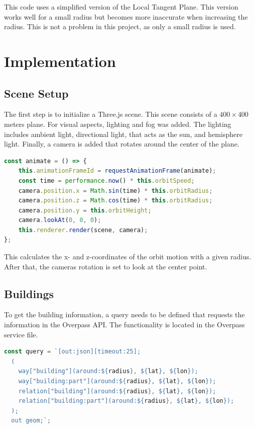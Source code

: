 This code uses a simplified version of the Local Tangent Plane. This version works well for a small radius but becomes more inaccurate when increasing the radius. This is not a problem in this project, as only a small radius is used.


\section{Implementation}

\subsection{Scene Setup}
The first step is to initialize a Three.js scene. This scene consists of a $400 \times 400$ meters plane. For visual aspects, lighting and fog was added. The lighting includes ambient light, directional light, that acts as the sun, and hemisphere light. Finally, a camera is added that rotates around the center of the plane. 

\begin{lstlisting}[language=JavaScript,caption=camera rotation calculation]
const animate = () => {
    this.animationFrameId = requestAnimationFrame(animate);
    const time = performance.now() * this.orbitSpeed;
    camera.position.x = Math.sin(time) * this.orbitRadius;
    camera.position.z = Math.cos(time) * this.orbitRadius;
    camera.position.y = this.orbitHeight;
    camera.lookAt(0, 0, 0);
    this.renderer.render(scene, camera);
};
\end{lstlisting}

This calculates the x- and z-coordinates of the orbit motion with a given radius. After that, the cameras rotation is set to look at the center point. 

\subsection{Buildings}
To get the building information, a query needs to be defined that requests the information in the Overpass API\@. The functionality is located in the Overpass service file. 

\begin{lstlisting}[language=JavaScript,caption=Overpass Query for the buildings]
const query = `[out:json][timeout:25];
  (
    way["building"](around:${radius}, ${lat}, ${lon});
    way["building:part"](around:${radius}, ${lat}, ${lon});
    relation["building"](around:${radius}, ${lat}, ${lon});
    relation["building:part"](around:${radius}, ${lat}, ${lon});
  );
  out geom;`;
\end{lstlisting}

